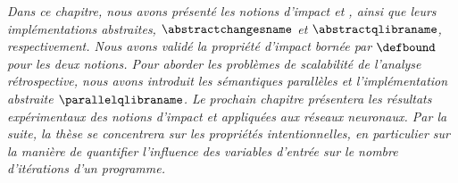 \frenchdiv

\emph{Dans ce chapitre, nous avons présenté les notions d'impact \changesname{} et \qlibraname{}, ainsi que leurs implémentations abstraites, $\abstractchangesname$ et $\abstractqlibraname$, respectivement. Nous avons validé la propriété d'impact bornée par $\defbound$ pour les deux notions. Pour aborder les problèmes de scalabilité de l'analyse rétrospective, nous avons introduit les sémantiques parallèles et l'implémentation abstraite $\parallelqlibraname$. Le prochain chapitre présentera les résultats expérimentaux des notions d'impact \changesname{} et \qlibraname{} appliquées aux réseaux neuronaux. Par la suite, la thèse se concentrera sur les propriétés intentionnelles, en particulier sur la manière de quantifier l'influence des variables d'entrée sur le nombre d'itérations d'un programme.}
